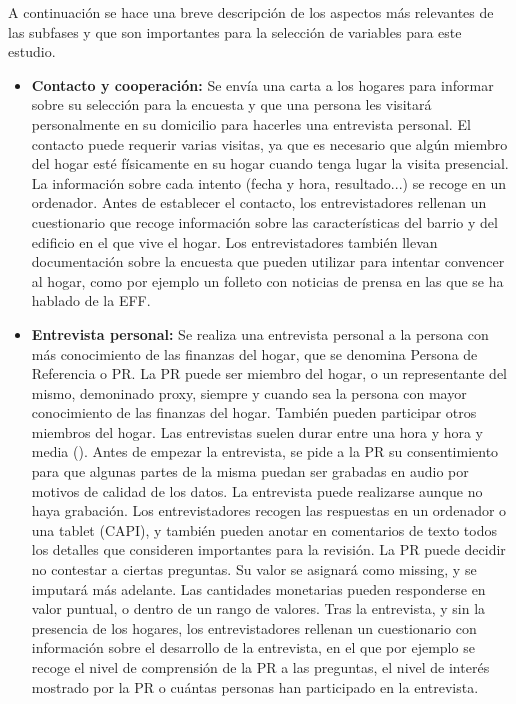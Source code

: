 A continuación se hace una breve descripción de los aspectos más relevantes de las subfases y que son importantes para la selección de variables para este estudio.

\begin{itemize}
    \item \textbf{Contacto y cooperación:} Se envía una carta a los hogares para informar sobre su selección para la encuesta y que una persona les visitará personalmente en su domicilio para hacerles una entrevista personal. El contacto puede requerir varias visitas, ya que es necesario que algún miembro del hogar esté físicamente en su hogar cuando tenga lugar la visita presencial. La información sobre cada intento (fecha y hora, resultado...) se recoge en un ordenador. Antes de establecer el contacto, los entrevistadores rellenan un cuestionario que recoge información sobre las características del barrio y del edificio en el que vive el hogar. Los entrevistadores también llevan documentación sobre la encuesta que pueden utilizar para intentar convencer al hogar, como por ejemplo un folleto con noticias de prensa en las que se ha hablado de la EFF.
    \item \textbf{Entrevista personal:} Se realiza una entrevista personal a la persona con más conocimiento de las finanzas del hogar, que se denomina Persona de Referencia o PR. La PR puede ser miembro del hogar, o un representante del mismo, demoninado proxy, siempre y cuando sea la persona con mayor conocimiento de las finanzas del hogar. También pueden participar otros miembros del hogar. Las entrevistas suelen durar entre una hora y hora y media (\cite{effmethod2017}). Antes de empezar la entrevista, se pide a la PR su consentimiento para que algunas partes de la misma puedan ser grabadas en audio por motivos de calidad de los datos. La entrevista puede realizarse aunque no haya grabación. Los entrevistadores recogen las respuestas en un ordenador o una tablet (CAPI), y también pueden anotar en comentarios de texto todos los detalles que consideren importantes para la revisión. La PR puede decidir no contestar a ciertas preguntas. Su valor se asignará como missing, y se imputará más adelante. Las cantidades monetarias pueden responderse en valor puntual, o dentro de un rango de valores. Tras la entrevista, y sin la presencia de los hogares, los entrevistadores rellenan un cuestionario con información sobre el desarrollo de la entrevista, en el que por ejemplo se recoge el nivel de comprensión de la PR a las preguntas, el nivel de interés mostrado por la PR o cuántas personas han participado en la entrevista.

\end{itemize}
